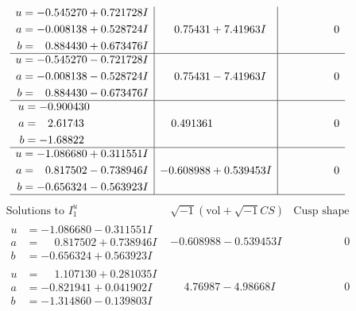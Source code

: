 \documentclass[1p]{elsarticle_modified}
\theoremstyle{definition}
\newcommand{\I}{\sqrt{-1}}
\begin{document}
$$\begin{array}{c|c|c}
\begin{aligned}
u &= -0.545270 + 0.721728 I \\
a &= -0.008138 + 0.528724 I \\
b &= \phantom{-}0.884430 + 0.673476 I\end{aligned}
 & \phantom{-}0.75431 + 7.41963 I & \phantom{-0.000000 } 0 \\ \hline\begin{aligned}
u &= -0.545270 - 0.721728 I \\
a &= -0.008138 - 0.528724 I \\
b &= \phantom{-}0.884430 - 0.673476 I\end{aligned}
 & \phantom{-}0.75431 - 7.41963 I & \phantom{-0.000000 } 0 \\ \hline\begin{aligned}
u &= -0.900430\phantom{ +0.000000I} \\
a &= \phantom{-}2.61743\phantom{ +0.000000I} \\
b &= -1.68822\phantom{ +0.000000I}\end{aligned}
 & \phantom{-}0.491361\phantom{ +0.000000I} & \phantom{-0.000000 } 0 \\ \hline\begin{aligned}
u &= -1.086680 + 0.311551 I \\
a &= \phantom{-}0.817502 - 0.738946 I \\
b &= -0.656324 - 0.563923 I\end{aligned}
 & -0.608988 + 0.539453 I & \phantom{-0.000000 } 0\\
 \hline 
 \end{array}$$\newpage$$\begin{array}{c|c|c}  
\text{Solutions to }I^u_{1}& \I (\text{vol} + \sqrt{-1}CS) & \text{Cusp shape}\\
 \hline 
\begin{aligned}
u &= -1.086680 - 0.311551 I \\
a &= \phantom{-}0.817502 + 0.738946 I \\
b &= -0.656324 + 0.563923 I\end{aligned}
 & -0.608988 - 0.539453 I & \phantom{-0.000000 } 0 \\ \hline\begin{aligned}
u &= \phantom{-}1.107130 + 0.281035 I \\
a &= -0.821941 + 0.041902 I \\
b &= -1.314860 - 0.139803 I\end{aligned}
 & \phantom{-}4.76987 - 4.98668 I & \phantom{-0.000000 } 0 \\ \hline\begin{aligned}

\end{aligned}
\end{array}$$
\end{document}

